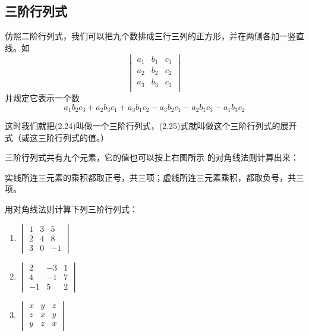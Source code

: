 \subsection{三阶行列式}

仿照二阶行列式，我们可以把九个数排成三行三列的正方形，并在两侧各加一竖直线。如
\begin{equation}
    \begin{vmatrix}
  a_1&b_1&c_1\\a_2&b_2&c_2\\a_3&b_3&c_3\\      
    \end{vmatrix}
\end{equation}
并规定它表示一个数
\begin{equation}
    a_1b_2c_3+a_2b_3c_1+a_3b_1c_2-a_3b_2c_1-a_2b_1c_3-a_1b_3c_2
\end{equation}

这时我们就把(2.24)叫做一个三阶行列式，(2.25)式就叫做这个三阶行列式的展开式（或这三阶行列式的值。）

三阶行列式共有九个元素，它的值也可以按上右图所示
的对角线法则计算出来：

实线所连三元素的乘积都取正号，共三项；虚线所连三元素乘积，都取负号，共三项。

\begin{example}
    用对角线法则计算下列三阶行列式：
\begin{multicols}{3}
\begin{enumerate}
    \item $\begin{vmatrix}
        1&3&5\\2&4&8\\3&0&-1
    \end{vmatrix}$
    \item $\begin{vmatrix}
        2&-3&1\\4&-1&7\\-1&5&2
    \end{vmatrix}$
    \item $\begin{vmatrix}
        x&y&z\\z&x&y\\y&z&x
    \end{vmatrix}$
\end{enumerate} 
\end{multicols}
\end{example}

\begin{solution}


    


\end{solution}

